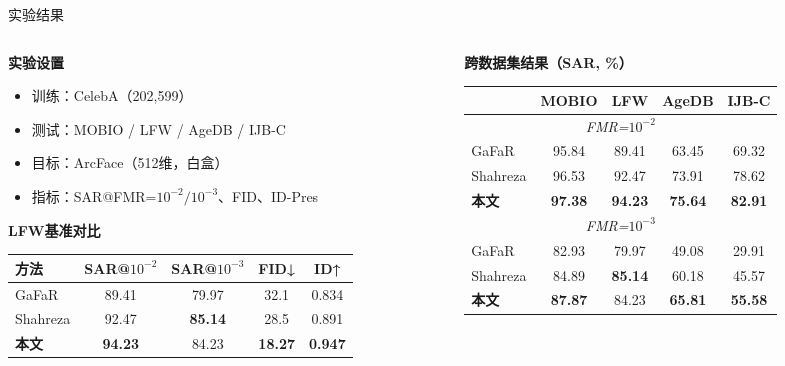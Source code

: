 \documentclass[aspectratio=169,12pt]{beamer}
\renewcommand{\textbf}[1]{\textcolor{hitblue}{\bfseries #1}}
\begin{document}
\begin{frame}{实验结果}
\begin{columns}[T]
\begin{column}{0.5\textwidth}
\footnotesize\textbf{实验设置}
\begin{itemize}\setlength{\itemsep}{1pt}
  \item 训练：CelebA（202,599）
  \item 测试：MOBIO / LFW / AgeDB / IJB-C
  \item 目标：ArcFace（512维，白盒）
  \item 指标：SAR@FMR=$10^{-2}/10^{-3}$、FID、ID-Pres
\end{itemize}
\vspace{4pt}
\footnotesize\textbf{LFW基准对比}\\[2pt]
{\scriptsize\begin{tabular}{lcccc}
\toprule
\textbf{方法} & \textbf{SAR@$10^{-2}$} & \textbf{SAR@$10^{-3}$} & \textbf{FID↓} & \textbf{ID↑} \\
\midrule
GaFaR        & 89.41 & 79.97 & 32.1 & 0.834 \\
Shahreza     & 92.47 & \textbf{85.14} & 28.5 & 0.891 \\
\textbf{本文} & \textbf{94.23} & 84.23 & \textbf{18.27} & \textbf{0.947} \\
\bottomrule
\end{tabular}}
\end{column}
\begin{column}{0.5\textwidth}
\footnotesize\textbf{跨数据集结果（SAR, \%）}\\[2pt]
{\scriptsize\begin{tabular}{lcccc}
\toprule
 & \textbf{MOBIO} & \textbf{LFW} & \textbf{AgeDB} & \textbf{IJB-C} \\
\midrule
\multicolumn{5}{c}{\textit{FMR=$10^{-2}$}} \\
GaFaR        & 95.84 & 89.41 & 63.45 & 69.32 \\
Shahreza     & 96.53 & 92.47 & 73.91 & 78.62 \\
\textbf{本文} & \textbf{97.38} & \textbf{94.23} & \textbf{75.64} & \textbf{82.91} \\
\multicolumn{5}{c}{\textit{FMR=$10^{-3}$}} \\
GaFaR        & 82.93 & 79.97 & 49.08 & 29.91 \\
Shahreza     & 84.89 & \textbf{85.14} & 60.18 & 45.57 \\
\textbf{本文} & \textbf{87.87} & 84.23 & \textbf{65.81} & \textbf{55.58} \\
\bottomrule
\end{tabular}}
\end{column}
\end{columns}
\end{frame} %
\end{document}
